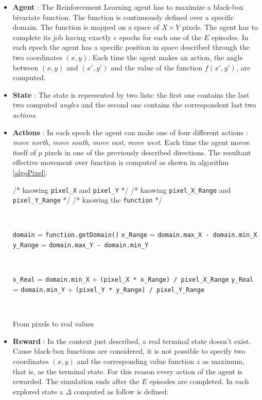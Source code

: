 \begin{itemize}
	
	\item \textbf{Agent} : The Reinforcement Learning agent has to maximize a black-box bivariate function. The function is continuously defined over a specific domain. The function is mapped on a space of $X \times Y$ pixels. The agent has to complete its job having exactly $e$ epochs for each one of the $E$ episodes. In each epoch the agent has a specific position in space described through the two coordinates $(x, y)$. Each time the agent makes an action, the angle between $(x, y)$ and $(x', y')$ and the value of the function $f(x', y')$, are computed.
	
	\item \textbf{State} : The state is represented by two lists: the first one contains the last two computed \textit{angles} and the second one contains the correspondent last two \textit{actions}.
	
	\item \textbf{Actions} : In each epoch the agent can make one of four different actions : \textit{move north}, \textit{move  south}, \textit{move east}, \textit{move west}. Each time the agent moves itself of $p$ pixels in one of the previously described directions. The resultant effective movement over function is computed as shown in algorithm \ref{algoPixel}.
	
	\begin{algorithm} [h!]
		/* knowing {\tt pixel\_X} and {\tt pixel\_Y} */\;
		/* knowing {\tt pixel\_X\_Range} and {\tt pixel\_Y\_Range} */ \;
		/* knowing the {\tt function} */\;
		
		\
		
		{\tt domain} = {\tt function.getDomain()} \;
		{\tt x\_Range} = {\tt domain.max\_X - domain.min\_X} \;
		{\tt y\_Range} = {\tt domain.max\_Y - domain.min\_Y} \;
		
		\
		
		{\tt x\_Real} = {\tt domain.min\_X} + {\tt(pixel\_X * x\_Range) / pixel\_X\_Range} \;
		{\tt y\_Real} = {\tt domain.min\_Y} + {\tt (pixel\_Y * y\_Range) / pixel\_Y\_Range} \;
		
		\
		
		\caption{From pixels to real values} 
		\label{algoPixel}
	\end{algorithm}
	
	\item \textbf{Reward} : In the context just described, a real terminal state doesn't exist. Cause black-box functions are considered, it is not possible to specify two coordinates $(x, y)$ and the corresponding value function $z$ as maximum, that is, as the terminal state. For this reason every action of the agent is rewarded. The simulation ends after the $E$ episodes are completed.
	In each explored state a $\Delta$ computed as follow is defined: 
	

\end{itemize}
